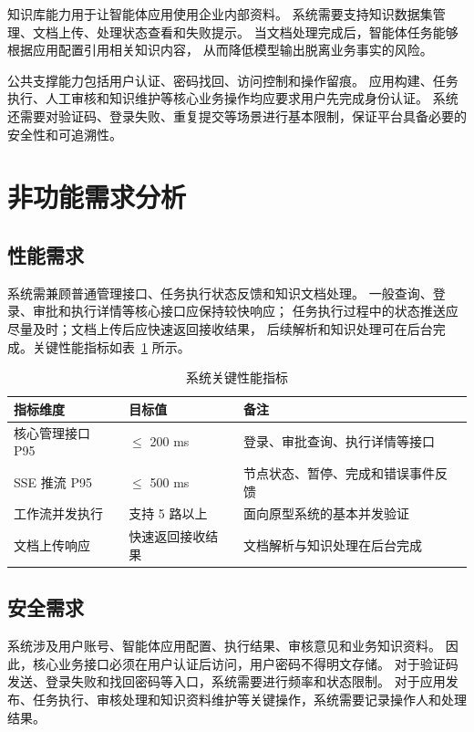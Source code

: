 知识库能力用于让智能体应用使用企业内部资料。
系统需要支持知识数据集管理、文档上传、处理状态查看和失败提示。
当文档处理完成后，智能体任务能够根据应用配置引用相关知识内容，
从而降低模型输出脱离业务事实的风险。

公共支撑能力包括用户认证、密码找回、访问控制和操作留痕。
应用构建、任务执行、人工审核和知识维护等核心业务操作均应要求用户先完成身份认证。
系统还需要对验证码、登录失败、重复提交等场景进行基本限制，保证平台具备必要的安全性和可追溯性。

\section{非功能需求分析}

\subsection{性能需求}

系统需兼顾普通管理接口、任务执行状态反馈和知识文档处理。
一般查询、登录、审批和执行详情等核心接口应保持较快响应；
任务执行过程中的状态推送应尽量及时；文档上传后应快速返回接收结果，
后续解析和知识处理可在后台完成。关键性能指标如表~\ref{tab:perf} 所示。

\begin{table}[H]
  \centering
  \caption{系统关键性能指标}
  \label{tab:perf}
  \begin{tabular}{l l p{6cm}}
    \toprule
    指标维度 & 目标值 & 备注 \\
    \midrule
    核心管理接口 P95 & $\le$ 200 ms & 登录、审批查询、执行详情等接口 \\
    SSE 推流 P95 & $\le$ 500 ms & 节点状态、暂停、完成和错误事件反馈 \\
    工作流并发执行 & 支持 5 路以上 & 面向原型系统的基本并发验证 \\
    文档上传响应 & 快速返回接收结果 & 文档解析与知识处理在后台完成 \\
    \bottomrule
  \end{tabular}
\end{table}

\subsection{安全需求}

系统涉及用户账号、智能体应用配置、执行结果、审核意见和业务知识资料。
因此，核心业务接口必须在用户认证后访问，用户密码不得明文存储。
对于验证码发送、登录失败和找回密码等入口，系统需要进行频率和状态限制。
对于应用发布、任务执行、审核处理和知识资料维护等关键操作，系统需要记录操作人和处理结果。

